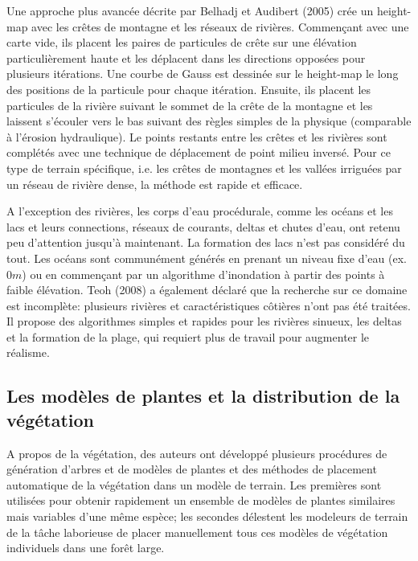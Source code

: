 \documentclass[11pt]{article}
\begin{document}
Une approche plus avancée décrite par Belhadj et Audibert (2005) crée un height-map avec les crêtes de montagne et les réseaux de rivières. Commençant avec une carte vide, ils placent les paires de particules de crête sur une élévation particulièrement haute et les déplacent dans les directions opposées pour plusieurs itérations. Une courbe de Gauss est dessinée sur le height-map le long des positions de la particule pour chaque itération. Ensuite, ils placent les particules de la rivière suivant le sommet de la crête de la montagne et les laissent s'écouler vers le bas suivant des règles simples de la physique (comparable à l'érosion hydraulique). Le points restants entre les crêtes et les rivières sont complétés avec une technique de déplacement de point milieu inversé. Pour ce type de terrain spécifique, i.e. les crêtes de montagnes et les vallées irriguées par un réseau de rivière dense, la méthode est rapide et efficace. \newline
 
 A l'exception des rivières, les corps d'eau procédurale, comme les océans et les lacs et leurs connections, réseaux de courants, deltas et chutes d'eau, ont retenu peu d'attention jusqu'à maintenant. La formation des lacs n'est pas considéré du tout. Les océans sont communément générés en  prenant un niveau fixe d'eau (ex. $0m$) ou en commençant par un algorithme d'inondation à partir des points à faible élévation. Teoh (2008) a également déclaré que la recherche sur ce domaine est incomplète: plusieurs rivières et caractéristiques côtières n'ont pas été traitées. Il propose des algorithmes simples et rapides pour les rivières sinueux, les deltas et la formation de la plage, qui requiert plus de travail pour augmenter le réalisme.
 
\subsection{Les modèles de plantes et la distribution de la végétation}

A propos de la végétation, des auteurs ont développé plusieurs procédures de génération d'arbres et de modèles de plantes et des méthodes de placement automatique de la végétation dans un modèle de terrain. Les premières sont utilisées pour obtenir rapidement un ensemble de modèles de plantes similaires mais variables d'une même espèce; les secondes délestent les modeleurs de terrain de la tâche laborieuse de placer manuellement tous ces modèles de végétation individuels dans une forêt large. \newline
\end{document}
